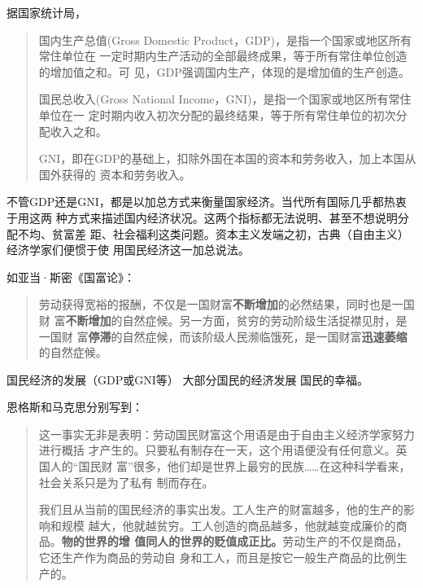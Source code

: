 据国家统计局，

\begin{quotation}
  国内生产总值(Gross Domestic Product，GDP)，是指一个国家或地区所有常住单位在
  一定时期内生产活动的全部最终成果，等于所有常住单位创造的增加值之和。可
  见，GDP强调国内生产，体现的是增加值的生产创造。


  国民总收入(Gross National Income，GNI)，是指一个国家或地区所有常住单位在一
  定时期内收入初次分配的最终结果，等于所有常住单位的初次分配收入之和。

  GNI，即在GDP的基础上，扣除外国在本国的资本和劳务收入，加上本国从国外获得的
  资本和劳务收入。
\end{quotation}

不管GDP还是GNI，都是以加总方式来衡量国家经济。当代所有国际几乎都热衷于用这两
种方式来描述国内经济状况。这两个指标都无法说明、甚至不想说明分配不均、贫富差
距、社会福利这类问题。资本主义发端之初，古典（自由主义）经济学家们便惯于使
用国民经济这一加总说法。

如亚当·斯密《国富论》：
\begin{quotation}
  劳动获得宽裕的报酬，不仅是一国财富\textbf{不断增加}的必然结果，同时也是一国财
  富\textbf{不断增加}的自然症候。另一方面，贫穷的劳动阶级生活捉襟见肘，是一国财
  富\textbf{停滞}的自然症候，而该阶级人民濒临饿死，是一国财富\textbf{迅速萎缩}的自然症候。
\end{quotation}


国民经济的发展（GDP或GNI等） \neq 大部分国民的经济发展 \neq 国民的幸福。

恩格斯和马克思分别写到：
\begin{quotation}
  这一事实无非是表明：劳动国民财富这个用语是由于自由主义经济学家努力进行概括
  才产生的。只要私有制存在一天，这个用语便没有任何意义。英国人的“国民财
  富”很多，他们却是世界上最穷的民族……在这种科学看来，社会关系只是为了私有
  制而存在。

  我们且从当前的国民经济的事实出发。工人生产的财富越多，他的生产的影响和规模
  越大，他就越贫穷。工人创造的商品越多，他就越变成廉价的商品。\textbf{物的世界的增
    值同人的世界的贬值成正比。}劳动生产的不仅是商品，它还生产作为商品的劳动自
  身和工人，而且是按它一般生产商品的比例生产的。
\end{quotation}

